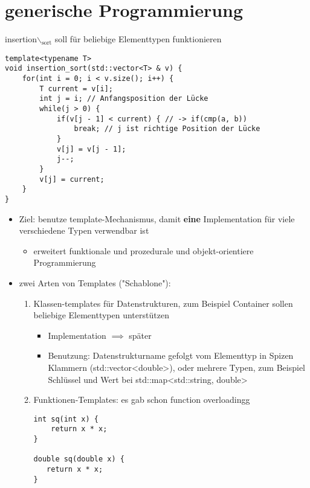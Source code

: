 \documentclass[a4paper]{scrartcl}
\begin{document}
\section{generische Programmierung}
\label{sec-14}
insertion$\backslash$$_{\text{sort}}$ soll für beliebige Elementtypen funktionieren
\begin{verbatim}
template<typename T>
void insertion_sort(std::vector<T> & v) {
	for(int i = 0; i < v.size(); i++) {
		T current = v[i];
		int j = i; // Anfangsposition der Lücke
		while(j > 0) {
			if(v[j - 1] < current) { // -> if(cmp(a, b))
				break; // j ist richtige Position der Lücke
			}
			v[j] = v[j - 1];
			j--;
		}
		v[j] = current;
	}
}
\end{verbatim}
\begin{itemize}
\item Ziel: benutze template-Mechanismus, damit \textbf{eine} Implementation für viele verschiedene Typen verwendbar ist
\begin{itemize}
\item erweitert funktionale und prozedurale und objekt-orientiere Programmierung
\end{itemize}
\item zwei Arten von Templates ("Schablone"):
\begin{enumerate}
\item Klassen-templates für Datenstrukturen, zum Beispiel Container sollen beliebige Elementtypen unterstützen
\begin{itemize}
\item Implementation $\implies$ später
\item Benutzung: Datenstrukturname gefolgt vom Elementtyp in Spizen Klammern (std::vector<double>), oder mehrere Typen, zum Beispiel Schlüssel und Wert bei std::map<std::string, double>
\end{itemize}
\item Funktionen-Templates: es gab schon function overloadingg
\begin{verbatim}
int sq(int x) {
	return x * x;
}

double sq(double x) {
   return x * x;
}


\end{verbatim}
\end{enumerate}
\end{itemize}$$
\end{document}

